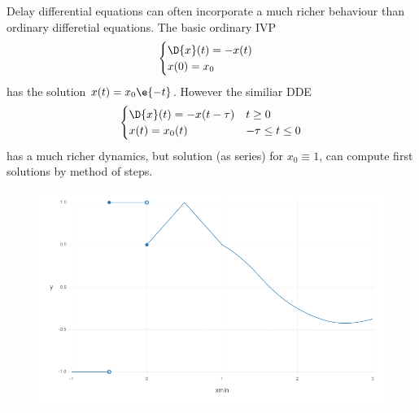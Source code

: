     \begin{example}\label{ex:ode-dde}
        Delay differential equations can often incorporate a much richer behaviour than ordinary differetial equations.
        The basic ordinary IVP
        \begin{equation}
            \begin{cases}
                \D{x}(t) = -x(t)\\
                x(0) = x_0
            \end{cases}
        \end{equation}
        has the solution $x(t)=x_0 \e{-t}$. However the similiar DDE
        \begin{equation}
            \begin{cases}
                \D{x}(t) = -x(t-\tau) & t\geq 0\\
                x(t) = x_0(t) & -\tau\leq t\leq 0
            \end{cases}
        \end{equation}
        has a much richer dynamics, but solution (as series) for $x_0\equiv 1$, can compute first solutions by method of steps.   
    \end{example}

    \begin{figure}[b]\centering
        \includegraphics[width=\textwidth]{figures/piecewise-initial-function.png}
    	\label{Piecewise continuous initial function.}
    \end{figure}
